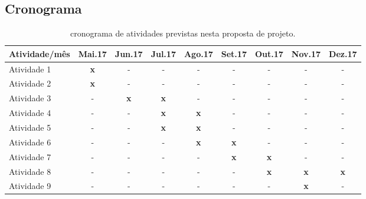 \documentclass[12pt]{article}
\begin{document}
\subsection{Cronograma}
\begin{table}[!ht]
\caption{cronograma de atividades previstas nesta proposta de projeto.} 
\label{tab:cronograma}
\begin{center}
\smallskip
\begin{tabular}{l cccccccc}
    \toprule
    \small Atividade/mês & \small Mai.17 & \small Jun.17 & \small Jul.17
                         & \small Ago.17 & \small Set.17 & \small Out.17
                         & \small Nov.17 & \small Dez.17
    \\ \hline

    \small Atividade 1   
    & \small {\bf x} & \small - & \small - & \small - & \small -
    & \small - & \small - & \small - \\
    

    \small Atividade 2   
    & \small {\bf x} & \small - & \small - & \small - & \small -
    & \small - & \small - & \small - \\

    \small Atividade 3   
    & \small - & \small {\bf x} & \small {\bf x} & \small - & \small -
    & \small - & \small - & \small - \\

    \small Atividade 4
    & \small - & \small - & \small {\bf x} & \small {\bf x} & \small -
    & \small - & \small - & \small - \\

    \small Atividade 5   
    & \small - & \small - & \small {\bf x} & \small {\bf x} & \small -
    & \small - & \small - & \small - \\

    \small Atividade 6   
    & \small - & \small - & \small - & \small {\bf x} & \small {\bf x}
    & \small - & \small - & \small - \\

    \small Atividade 7
    & \small - & \small - & \small - & \small - & {\bf x}
    & \small {\bf x} & \small - & \small - \\

    \small Atividade 8  
    & \small - & \small - & \small - & \small - & -
    & \small {\bf x} & \small {\bf x} & \small {\bf x} \\

    \small Atividade 9
    & \small - & \small - & \small - & \small - & \small -  
    & \small - & \small {\bf x} & \small - \\


\end{tabular}
\end{center}
\end{table}
\end{document}
